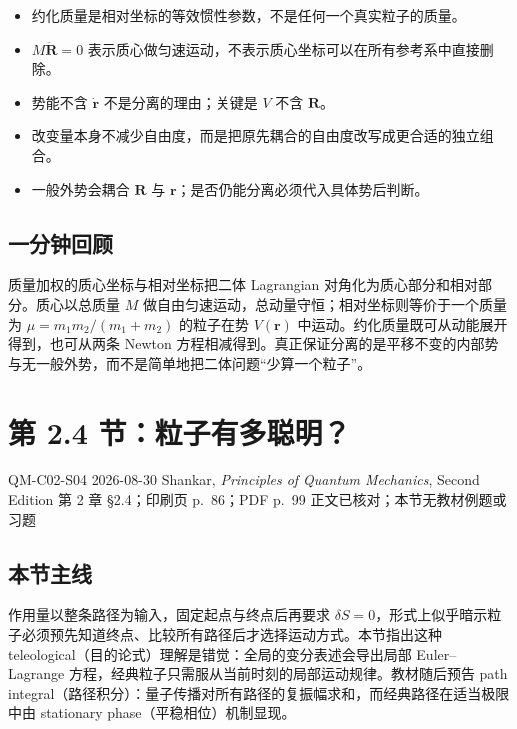 \begin{itemize}[leftmargin=*]
  \item 约化质量是相对坐标的等效惯性参数，不是任何一个真实粒子的质量。
  \item $M\ddot{\bm R}=0$ 表示质心做匀速运动，不表示质心坐标可以在所有参考系中直接删除。
  \item 势能不含 $\dot{\bm r}$ 不是分离的理由；关键是 $V$ 不含 $\bm R$。
  \item 改变量本身不减少自由度，而是把原先耦合的自由度改写成更合适的独立组合。
  \item 一般外势会耦合 $\bm R$ 与 $\bm r$；是否仍能分离必须代入具体势后判断。
\end{itemize}

\subsection{一分钟回顾}

质量加权的质心坐标与相对坐标把二体 Lagrangian 对角化为质心部分和相对部分。质心以总质量 $M$ 做自由匀速运动，总动量守恒；相对坐标则等价于一个质量为 $\mu=m_1m_2/(m_1+m_2)$ 的粒子在势 $V(\bm r)$ 中运动。约化质量既可从动能展开得到，也可从两条 Newton 方程相减得到。真正保证分离的是平移不变的内部势与无一般外势，而不是简单地把二体问题“少算一个粒子”。

\section{第 2.4 节：粒子有多聪明？}
\label{section:QM-C02-S04}

\studymeta
  {QM-C02-S04}
  {2026-08-30}
  {Shankar, \textit{Principles of Quantum Mechanics}, Second Edition}
  {第 2 章 \S 2.4；印刷页 p.~86；PDF p.~99}
  {正文已核对；本节无教材例题或习题}

\subsection{本节主线}

作用量以整条路径为输入，固定起点与终点后再要求 $\delta S=0$，形式上似乎暗示粒子必须预先知道终点、比较所有路径后才选择运动方式。本节指出这种 teleological（目的论式）理解是错觉：全局的变分表述会导出局部 Euler--Lagrange 方程，经典粒子只需服从当前时刻的局部运动规律。教材随后预告 path integral（路径积分）：量子传播对所有路径的复振幅求和，而经典路径在适当极限中由 stationary phase（平稳相位）机制显现。


